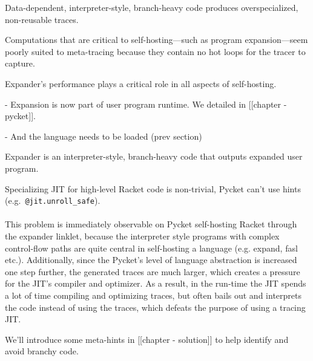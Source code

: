 		\begin{sectionpoint}
			Data-dependent, interpreter-style, branch-heavy code produces overspecialized, non-reusable traces.

			Computations that are critical to self-hosting—such as program expansion—seem poorly suited to meta-tracing because they contain no hot loops for the tracer to capture.
		\end{sectionpoint}

		\begin{paragraph-here}
			Expander's performance plays a critical role in all aspects of self-hosting.

				- Expansion is now part of user program runtime. We detailed in [[chapter - pycket]].

				- And the language needs to be loaded (prev section)
		\end{paragraph-here}

		\begin{paragraph-here}
			Expander is an interpreter-style, branch-heavy code that outputs expanded user program.
		\end{paragraph-here}

		\begin{paragraph-here}
			Specializing JIT for high-level Racket code is non-trivial, Pycket can't use hints (e.g.\ \verb|@jit.unroll_safe|).
		\end{paragraph-here}

		\paragraph{}%
		This problem is immediately observable on Pycket self-hosting Racket
		through the expander linklet, because the interpreter style programs
		with complex control-flow paths are quite central in self-hosting a
		language (e.g. expand, fasl etc.). Additionally, since the Pycket's
		level of language abstraction is increased one step further, the
		generated traces are much larger, which creates a pressure for the
		JIT's compiler and optimizer. As a result, in the run-time the JIT
		spends a lot of time compiling and optimizing traces, but often bails
		out and interprets the code instead of using the traces, which defeats
		the purpose of using a tracing JIT.

		\begin{paragraph-here}
			We'll introduce some meta-hints in [[chapter - solution]] to help identify and avoid branchy code.
		\end{paragraph-here}


